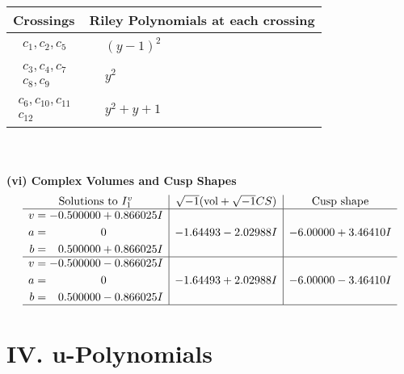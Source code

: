 \documentclass[1p]{elsarticle_modified}
\theoremstyle{definition}
\newcommand{\I}{\sqrt{-1}}
\begin{document}
\begin{tabular}{m{50pt}|m{274pt}}
Crossings & \hspace{64pt}Riley Polynomials at each crossing \\
\hline $$\begin{aligned}c_{1},c_{2},c_{5}\end{aligned}$$&$\begin{aligned}
&(y-1)^2
\end{aligned}$\\
\hline $$\begin{aligned}c_{3},c_{4},c_{7}\\c_{8},c_{9}\end{aligned}$$&$\begin{aligned}
&y^2
\end{aligned}$\\
\hline $$\begin{aligned}c_{6},c_{10},c_{11}\\c_{12}\end{aligned}$$&$\begin{aligned}
&y^2+y+1
\end{aligned}$\\
\hline
\end{tabular}\\~\\
\newpage\flushleft \textbf{(vi) Complex Volumes and Cusp Shapes}
$$\begin{array}{c|c|c}  
\text{Solutions to }I^v_{1}& \I (\text{vol} + \sqrt{-1}CS) & \text{Cusp shape}\\
 \hline 
\begin{aligned}
v &= -0.500000 + 0.866025 I \\
a &= \phantom{-0.000000 } 0 \\
b &= \phantom{-}0.500000 + 0.866025 I\end{aligned}
 & -1.64493 - 2.02988 I & -6.00000 + 3.46410 I \\ \hline\begin{aligned}
v &= -0.500000 - 0.866025 I \\
a &= \phantom{-0.000000 } 0 \\
b &= \phantom{-}0.500000 - 0.866025 I\end{aligned}
 & -1.64493 + 2.02988 I & -6.00000 - 3.46410 I\\
 \hline 
 \end{array}$$\newpage
\newpage\renewcommand{\arraystretch}{1}
\centering \section*{ IV. u-Polynomials}
\end{document}
